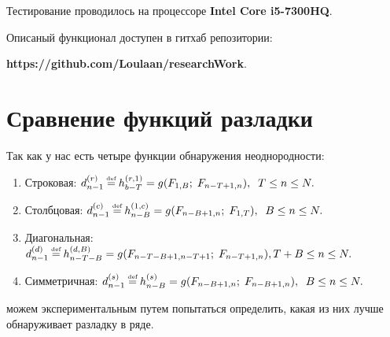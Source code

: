 \documentclass[specialist, substylefile = spbu.rtx,
			   subf, href, 12pt]{disser}
\newcommand\eqdef{\mathrel{\stackrel{\makebox[0pt]{\mbox{\normalfont\tiny def}}}{=}}}
\begin{document}
Тестирование проводилось на процессоре \textbf{Intel Core i5-7300HQ}.

Описаный функционал доступен в гитхаб репозитории:

\textbf{https://github.com/Loulaan/researchWork}.


\newpage
\chapter{Сравнение функций разладки}

Так как у нас есть четыре функции обнаружения неоднородности:
\begin{enumerate}
	\item 
	Строковая: $d_{n-1}^{(r)} \eqdef h_{b-T}^{(r, 1)} = g(F_{1, B};\; F_{n-T+1, n}), \;\; T \leq n \leq N.$
	
	\item
	Столбцовая: $d_{n-1}^{(c)} \eqdef h_{n-B}^{(1, c)} = g(F_{n-B+1, n};\; F_{1, T}), \;\; B \leq n \leq N.$
	
	\item
	Диагональная: $d_{n-1}^{(d)} \eqdef h_{n-T-B}^{(d, B)} = g(F_{n-T-B+1, n-T+1};\; F_{n-T+1, n}), T + B \leq n \leq N.$
	
	\item
	Симметричная: $d_{n-1}^{(s)} \eqdef h_{n-B}^{(s)} = g(F_{n-B+1, n};\; F_{n-B+1, n}), \;\; B \leq n \leq N.$
	
\end{enumerate}
можем экспериментальным путем попытаться определить, какая из них лучше обнаруживает разладку в ряде.
\end{document}
